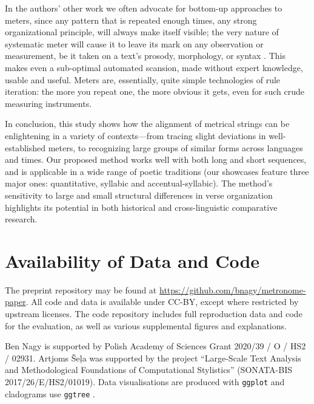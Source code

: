 \documentclass[
    hf
]{ceurart}
\begin{document}
In the authors' other work we often advocate for bottom-up approaches to meters, since any pattern that is repeated enough times, any strong organizational principle, will always make itself visible; the very nature of systematic meter will cause it to leave its mark on any observation or measurement, be it taken on a text's prosody, morphology, or syntax \cite{gasparov_linguistics_2008}. This makes even a sub-optimal automated scansion, made without expert knowledge, usable and useful. Meters are, essentially, quite simple technologies of rule iteration: the more you repeat one, the more obvious it gets, even for such crude measuring instruments.

In conclusion, this study shows how the alignment of metrical strings can be enlightening in a variety of contexts---from tracing slight deviations in well-established meters, to recognizing large groups of similar forms across languages and times. Our proposed method works well with both long and short sequences, and is applicable in a wide range of poetic traditions (our showcases feature three major ones: quantitative, syllabic and accentual-syllabic). The method's sensitivity to large and small structural differences in verse organization highlights its potential in both historical and cross-linguistic comparative research.

\section{Availability of Data and Code}\label{sec:data}

The preprint repository may be found at \url{https://github.com/bnagy/metronome-paper}. All code
and data is available under CC-BY, except where restricted by upstream licenses.
The code repository includes full reproduction data and code for the evaluation,
as well as various supplemental figures and explanations.

\FloatBarrier

\begin{acknowledgments}
    Ben Nagy is supported by Polish Academy of Sciences Grant
    2020/39 / O / HS2 / 02931. Artjoms Šeļa was supported by the project “Large-Scale Text Analysis and Methodological Foundations of Computational Stylistics” (SONATA-BIS 2017/26/E/HS2/01019). Data visualisations are produced with \texttt{ggplot} \cite{ggplot} and cladograms use \texttt{ggtree} \cite{ggtree}.
\end{acknowledgments}
\end{document}
